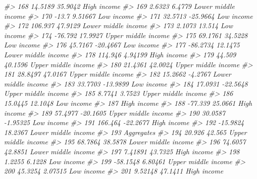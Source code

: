 \documentclass[
  xelatex, ja=standard]{bxjsbook}
\newenvironment{Shaded}{\begin{snugshade}}{\end{snugshade}}
\newcommand{\CommentTok}[1]{\textcolor[rgb]{0.56,0.35,0.01}{\textit{#1}}}
\theoremstyle{definition}
\theoremstyle{definition}
\theoremstyle{definition}
\theoremstyle{definition}
\theoremstyle{remark}
\begin{document}
\begin{Shaded}
\begin{Highlighting}[]
\CommentTok{\#\textgreater{} 168    14.5189    35.9042         High income}
\CommentTok{\#\textgreater{} 169     2.6323     6.4779 Lower middle income}
\CommentTok{\#\textgreater{} 170      {-}13.7    9.51667          Low income}
\CommentTok{\#\textgreater{} 171    32.5713   {-}25.9664          Low income}
\CommentTok{\#\textgreater{} 172    106.937    47.9129 Lower middle income}
\CommentTok{\#\textgreater{} 173     2.1073     13.514          Low income}
\CommentTok{\#\textgreater{} 174    {-}76.792    17.9927 Upper middle income}
\CommentTok{\#\textgreater{} 175    69.1761    34.5228          Low income}
\CommentTok{\#\textgreater{} 176    45.7167   {-}20.4667          Low income}
\CommentTok{\#\textgreater{} 177   {-}86.2734    12.1475 Lower middle income}
\CommentTok{\#\textgreater{} 178    114.946    4.94199         High income}
\CommentTok{\#\textgreater{} 179     44.509    40.1596 Upper middle income}
\CommentTok{\#\textgreater{} 180    21.4361    42.0024 Upper middle income}
\CommentTok{\#\textgreater{} 181    28.8497    47.0167 Upper middle income}
\CommentTok{\#\textgreater{} 182    15.2662    {-}4.2767 Lower middle income}
\CommentTok{\#\textgreater{} 183    33.7703   {-}13.9899          Low income}
\CommentTok{\#\textgreater{} 184    17.0931   {-}22.5648 Upper middle income}
\CommentTok{\#\textgreater{} 185     8.7741     3.7523 Upper middle income}
\CommentTok{\#\textgreater{} 186    15.0445    12.1048          Low income}
\CommentTok{\#\textgreater{} 187                               High income}
\CommentTok{\#\textgreater{} 188    {-}77.339    25.0661         High income}
\CommentTok{\#\textgreater{} 189    57.4977   {-}20.1605 Upper middle income}
\CommentTok{\#\textgreater{} 190    30.0587   {-}1.95325          Low income}
\CommentTok{\#\textgreater{} 191    166.464   {-}22.2677         High income}
\CommentTok{\#\textgreater{} 192   {-}15.9824    18.2367 Lower middle income}
\CommentTok{\#\textgreater{} 193                                Aggregates}
\CommentTok{\#\textgreater{} 194     20.926     42.565 Upper middle income}
\CommentTok{\#\textgreater{} 195    68.7864    38.5878 Lower middle income}
\CommentTok{\#\textgreater{} 196    74.6057    42.8851 Lower middle income}
\CommentTok{\#\textgreater{} 197    7.41891    43.7325         High income}
\CommentTok{\#\textgreater{} 198     1.2255     6.1228          Low income}
\CommentTok{\#\textgreater{} 199   {-}58.1548    6.80461 Upper middle income}
\CommentTok{\#\textgreater{} 200    45.3254    2.07515          Low income}
\CommentTok{\#\textgreater{} 201    9.52148    47.1411         High income}

\end{Highlighting}
\end{Shaded}
\end{document}
